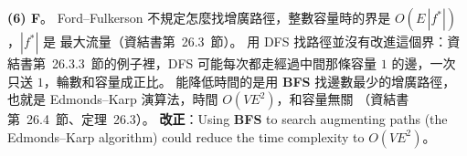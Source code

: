\begin{pastsoln}
\textbf{(6) F}。 Ford--Fulkerson 不規定怎麼找增廣路徑，整數容量時的界是 $O(E\,|f^*|)$，$|f^*|$ 是
最大流量（資結書第~26.3~節）。 用 DFS 找路徑並沒有改進這個界：資結書第~26.3.3~節的例子裡，DFS
可能每次都走經過中間那條容量 $1$ 的邊，一次只送 $1$，輪數和容量成正比。 能降低時間的是用
\textbf{BFS} 找邊數最少的增廣路徑，也就是 Edmonds--Karp 演算法，時間 $O(VE^2)$，和容量無關
（資結書第~26.4~節、定理~26.3）。 \textbf{改正}：Using \textbf{BFS} to search augmenting paths
(the Edmonds--Karp algorithm) could reduce the time complexity to $O(VE^2)$。
\end{pastsoln}
